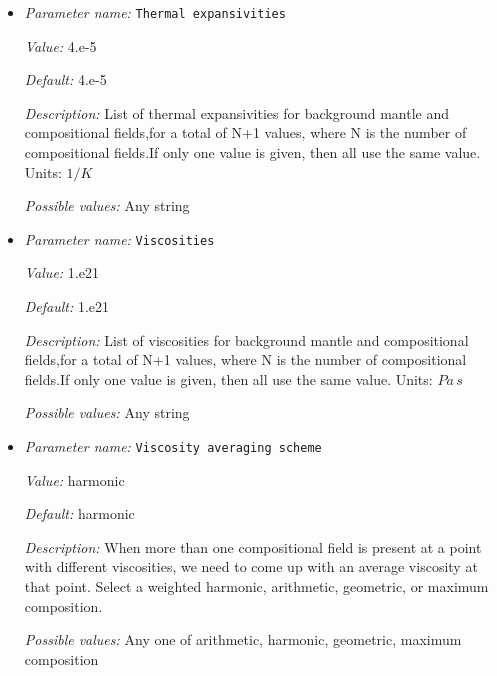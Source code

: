 \begin{itemize}
{\it Value:} 4.7


{\it Default:} 4.7


{\it Description:} List of thermal conductivities for background mantle and compositional fields,for a total of N+1 values, where N is the number of compositional fields.If only one value is given, then all use the same value. Units: $W/m/K$.


{\it Possible values:} Any string
\item {\it Parameter name:} {\tt Thermal expansivities}
\label{parameters:Material model/Multicomponent/Thermal expansivities}


{\it Value:} 4.e-5


{\it Default:} 4.e-5


{\it Description:} List of thermal expansivities for background mantle and compositional fields,for a total of N+1 values, where N is the number of compositional fields.If only one value is given, then all use the same value. Units: $1/K$


{\it Possible values:} Any string
\item {\it Parameter name:} {\tt Viscosities}
\label{parameters:Material model/Multicomponent/Viscosities}


{\it Value:} 1.e21


{\it Default:} 1.e21


{\it Description:} List of viscosities for background mantle and compositional fields,for a total of N+1 values, where N is the number of compositional fields.If only one value is given, then all use the same value. Units: $Pa \, s$


{\it Possible values:} Any string
\item {\it Parameter name:} {\tt Viscosity averaging scheme}
\label{parameters:Material model/Multicomponent/Viscosity averaging scheme}


{\it Value:} harmonic


{\it Default:} harmonic


{\it Description:} When more than one compositional field is present at a point with different viscosities, we need to come up with an average viscosity at that point.  Select a weighted harmonic, arithmetic, geometric, or maximum composition.


{\it Possible values:} Any one of arithmetic, harmonic, geometric, maximum composition
\end{itemize}


